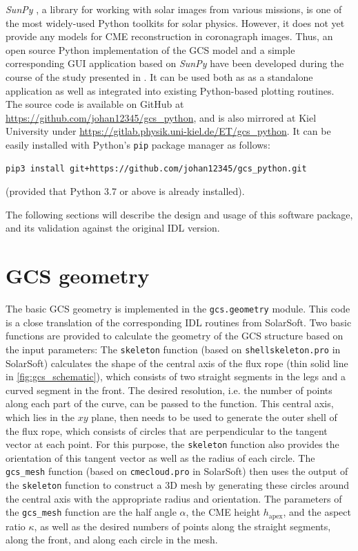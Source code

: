 \textit{SunPy} \citep{sunpy_community2020}, a library for working with solar images from various missions, is one of the most widely-used Python toolkits for solar physics. However, it does not yet provide any models for \ac{CME} reconstruction in coronagraph images.
Thus, an open source Python implementation of the \ac{GCS} model and a simple corresponding \ac{GUI} application based on \textit{SunPy} have been developed during the course of the study presented in \citet{Forstner-2021-SolO}. It can be used both as as a standalone application as well as integrated into existing Python-based plotting routines. The source code is available on GitHub at \url{https://github.com/johan12345/gcs_python}, and is also mirrored at Kiel University under \url{https://gitlab.physik.uni-kiel.de/ET/gcs_python}. It can be easily installed with Python's \texttt{pip} package manager as follows:
\begin{verbatim}
pip3 install git+https://github.com/johan12345/gcs_python.git
\end{verbatim}
(provided that Python 3.7 or above is already installed).

The following sections will describe the design and usage of this software package, and its validation against the original \ac{IDL} version.

\section{GCS geometry}

The basic \ac{GCS} geometry is implemented in the \texttt{gcs.geometry} module. This code is a close translation of the corresponding \ac{IDL} routines from SolarSoft. Two basic functions are provided to calculate the geometry of the \ac{GCS} structure based on the input parameters: The \texttt{skeleton} function (based on \texttt{shellskeleton.pro} in SolarSoft) calculates the shape of the central axis of the flux rope (thin solid line in \autoref{fig:gcs_schematic}), which consists of two straight segments in the legs and a curved segment in the front. The desired resolution, i.e. the number of points along each part of the curve, can be passed to the function.
This central axis, which lies in the $xy$ plane, then needs to be used to generate the outer shell of the flux rope, which consists of circles that are perpendicular to the tangent vector at each point. For this purpose, the \texttt{skeleton} function also provides the orientation of this tangent vector as well as the radius of each circle.
The \verb|gcs_mesh| function (based on \texttt{cmecloud.pro} in SolarSoft) then uses the output of the \texttt{skeleton} function to construct a 3D mesh by generating these circles around the central axis with the appropriate radius and orientation. The parameters of the \verb|gcs_mesh| function are the half angle $\alpha$, the \ac{CME} height $h_\text{apex}$, and the aspect ratio $\kappa$, as well as the desired numbers of points along the straight segments, along the front, and along each circle in the mesh.


